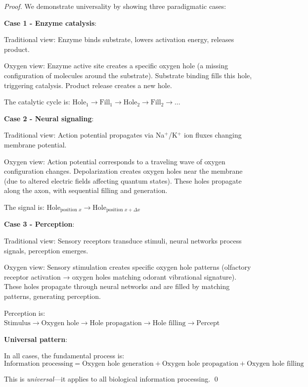 \begin{proof}
We demonstrate universality by showing three paradigmatic cases:

\textbf{Case 1 - Enzyme catalysis}:

Traditional view: Enzyme binds substrate, lowers activation energy, releases product.

Oxygen view: Enzyme active site creates a specific oxygen hole (a missing configuration of  molecules around the substrate). Substrate binding fills this hole, triggering catalysis. Product release creates a new hole.

The catalytic cycle is: $\text{Hole}_1 \to \text{Fill}_1 \to \text{Hole}_2 \to \text{Fill}_2 \to \ldots$

\textbf{Case 2 - Neural signaling}:

Traditional view: Action potential propagates via Na$^+$/K$^+$ ion fluxes changing membrane potential.

Oxygen view: Action potential corresponds to a traveling wave of oxygen configuration changes. Depolarization creates oxygen holes near the membrane (due to altered electric fields affecting  quantum states). These holes propagate along the axon, with sequential filling and generation.

The signal is: $\text{Hole}_{\text{position } x} \to \text{Hole}_{\text{position } x + \Delta x}$

\textbf{Case 3 - Perception}:

Traditional view: Sensory receptors transduce stimuli, neural networks process signals, perception emerges.

Oxygen view: Sensory stimulation creates specific oxygen hole patterns (olfactory receptor activation → oxygen holes matching odorant vibrational signature). These holes propagate through neural networks and are filled by matching patterns, generating perception.

Perception is: $\text{Stimulus} \to \text{Oxygen hole} \to \text{Hole propagation} \to \text{Hole filling} \to \text{Percept}$

\textbf{Universal pattern}:

In all cases, the fundamental process is:
\begin{equation}
\text{Information processing} = \text{Oxygen hole generation} + \text{Oxygen hole propagation} + \text{Oxygen hole filling}
\end{equation}

This is \textit{universal}—it applies to all biological information processing. \qed
\end{proof}

